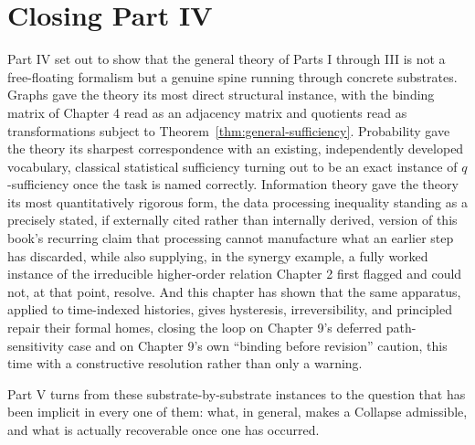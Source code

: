 \documentclass[11pt]{book}
\begin{document}
\section{Closing Part IV}

Part IV set out to show that the general theory of Parts I through III is not a free-floating formalism but a genuine spine running through concrete substrates. Graphs gave the theory its most direct structural instance, with the binding matrix of Chapter 4 read as an adjacency matrix and quotients read as transformations subject to Theorem~\ref{thm:general-sufficiency}. Probability gave the theory its sharpest correspondence with an existing, independently developed vocabulary, classical statistical sufficiency turning out to be an exact instance of $q$-sufficiency once the task is named correctly. Information theory gave the theory its most quantitatively rigorous form, the data processing inequality standing as a precisely stated, if externally cited rather than internally derived, version of this book's recurring claim that processing cannot manufacture what an earlier step has discarded, while also supplying, in the synergy example, a fully worked instance of the irreducible higher-order relation Chapter 2 first flagged and could not, at that point, resolve. And this chapter has shown that the same apparatus, applied to time-indexed histories, gives hysteresis, irreversibility, and principled repair their formal homes, closing the loop on Chapter 9's deferred path-sensitivity case and on Chapter 9's own ``binding before revision'' caution, this time with a constructive resolution rather than only a warning.

Part V turns from these substrate-by-substrate instances to the question that has been implicit in every one of them: what, in general, makes a Collapse admissible, and what is actually recoverable once one has occurred.
\end{document}
